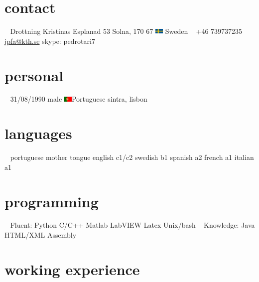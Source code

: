 \documentclass[]{friggeri-cv} %
\begin{document}


\begin{aside} %

\section{contact}
~
Drottning Kristinas Esplanad 53
Solna, 170 67
\includegraphics[width=0.4cm,height=0.3cm]{sweden} Sweden
~
+46 739737235
~
\href{mailto:jpfa@kth.se}{jpfa@kth.se}
skype: pedrotari7
\section{personal}
~
31/08/1990
male
\includegraphics[width=0.4cm,height=0.3cm]{portugal}Portuguese
sintra, lisbon
\section{languages}
~
portuguese mother tongue
english c1/c2
swedish b1
spanish a2
french a1
italian a1
\section{programming}
~
Fluent:
Python
C/C++
Matlab
LabVIEW
Latex
Unix/bash
~
Knowledge:
Java
HTML/XML
Assembly 
\end{aside}



\section{working experience}
\end{document}
